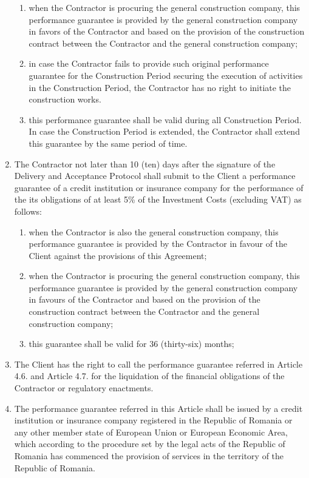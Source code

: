 \begin{multicols}{2}
\begin{enumerate}
\begin{enumerate}
		\item	when the Contractor is procuring the general construction company, this performance guarantee is provided by the general construction company in favors of the Contractor and based on the provision of the construction contract between the Contractor and the general construction company;
		\item	in case the Contractor fails to provide such original performance guarantee for the Construction Period securing the execution of activities in the Construction Period, the Contractor has no right to initiate the construction works.
		\item	this performance guarantee shall be valid during all Construction Period. In case the Construction Period is extended, the Contractor shall extend this guarantee by the same period of time.
	\end{enumerate}
	\item	The Contractor not later than 10 (ten) days after the signature of the Delivery and Acceptance Protocol shall submit to the Client a performance guarantee of a credit institution or insurance company for the performance of the its obligations of at least 5\% of the Investment Costs (excluding VAT) as follows:
	\begin{enumerate}
		\item	when the Contractor is also the general construction company, this performance guarantee is provided by the Contractor in favour of the Client against the provisions of this Agreement;
		\item	when the Contractor is procuring the general construction company, this performance guarantee is provided by the general construction company in favours of the Contractor and based on the provision of the construction contract between the Contractor and the general construction company;
		\item	this guarantee shall be valid for 36 (thirty-six) months;
	\end{enumerate}
	\item	The Client has the right to call the performance guarantee referred in Article 4.6. and Article 4.7. for the liquidation of the financial obligations of the Contractor or regulatory enactments. %
	\item	The performance guarantee referred in this Article shall be issued by a credit institution or insurance company registered in the Republic of Romania or any other member state of European Union or European Economic Area, which according to the procedure set by the legal acts of the Republic of Romania has commenced the provision of services in the territory of the Republic of Romania.
\end{enumerate}


\end{multicols}
